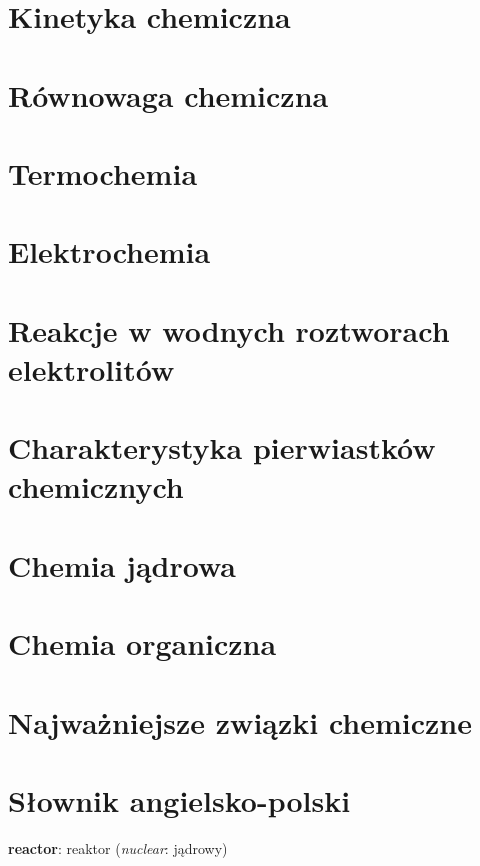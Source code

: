 \documentclass{createspace}
\begin{document}
\chapter{Kinetyka chemiczna}


\chapter{Równowaga chemiczna}


\chapter{Termochemia}


\chapter{Elektrochemia}


\chapter{Reakcje w wodnych roztworach elektrolitów}

\chapter{Charakterystyka pierwiastków chemicznych}






\chapter{Chemia jądrowa}


\chapter{Chemia organiczna}

\chapter{Najważniejsze związki chemiczne}



\appendix
\chapter{Słownik angielsko-polski}
\begin{compactitem}
\item \textbf{reactor}: reaktor (\emph{nuclear}: jądrowy)
\end{compactitem}

\raggedright



\printindex

\printindex[persons]
\end{document}

